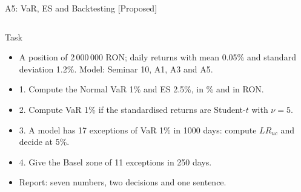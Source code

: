 \begin{frame}{A5: VaR, ES and Backtesting [Proposed]}
\propsub
\itemsize{\scriptsize}
\begin{columns}[T]
\begin{column}{\taskw}
\begin{block}{Task}
\begin{itemize}
    \item A position of 2\,000\,000 RON; daily returns with mean 0.05\% and standard deviation 1.2\%. Model: Seminar 10, A1, A3 and A5.
    \item 1. Compute the Normal VaR 1\% and ES 2.5\%, in \% and in RON.
    \item 2. Compute VaR 1\% if the standardised returns are Student-$t$ with $\nu = 5$.
    \item 3. A model has 17 exceptions of VaR 1\% in 1000 days: compute $LR_{uc}$ and decide at 5\%.
    \item 4. Give the Basel zone of 11 exceptions in 250 days.
    \item Report: seven numbers, two decisions and one sentence.
\end{itemize}
\end{block}
\end{column}
\begin{column}{\solw}
\end{column}
\end{columns}
\end{frame}

